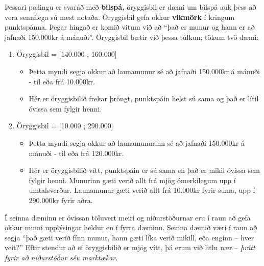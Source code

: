 \documentclass[
]{book}
\providecommand{\tightlist}{%
  \setlength{\itemsep}{0pt}\setlength{\parskip}{0pt}}
\begin{document}
Þessari pælingu er svarað með \textbf{bilspá,} öryggisbil er dæmi um bilspá auk þess að vera sennilega sú mest notaða. Öryggisbil gefa okkur \textbf{vikmörk} í kringum punktspánna. Þegar hingað er komið vitum við að ``það er munur og hann er að jafnaði 150.000kr á mánuði''. Öryggisbil bætir við þessa túlkun; tökum tvö dæmi:

\begin{enumerate}
\def\labelenumi{\arabic{enumi}.}
\tightlist
\item
  Öryggisbil = {[}140.000 ; 160.000{]}

  \begin{itemize}
  \item
    Þetta myndi segja okkur að launamunur sé að jafnaði 150.000kr á mánuði - til eða frá 10.000kr.
  \item
    Hér er öryggisbilið frekar þröngt, punktspáin helst sú sama og það er lítil óvissa sem fylgir henni.
  \end{itemize}
\item
  Öryggisbil = {[}10.000 ; 290.000{]}

  \begin{itemize}
  \item
    Þetta myndi segja okkur að launamunurinn sé að jafnaði 150.000kr á mánuði - til eða frá 120.000kr.
  \item
    Hér er öryggisbilið vítt, punktspáin er sú sama en það er mikil óvissa sem fylgir henni. Munurinn gæti verið allt frá mjög ómerkilegum upp í umtalsverður. Launamunur gæti verið allt frá 10.000kr fyrir suma, upp í 290.000kr fyrir aðra.
  \end{itemize}
\end{enumerate}

Í seinna dæminu er óvissan töluvert meiri og niðurstöðurnar eru í raun að gefa okkur minni upplýsingar heldur en í fyrra dæminu. Seinna dæmið væri í raun að segja ``það gæti verið fínn munur, hann gæti líka verið mikill, eða enginn -- hver veit?'' Eftir stendur að ef öryggisbilið er mjög vítt, þá erum við litlu nær -- \emph{þrátt fyrir að niðurstöður séu marktækar}.

  
\end{document}
